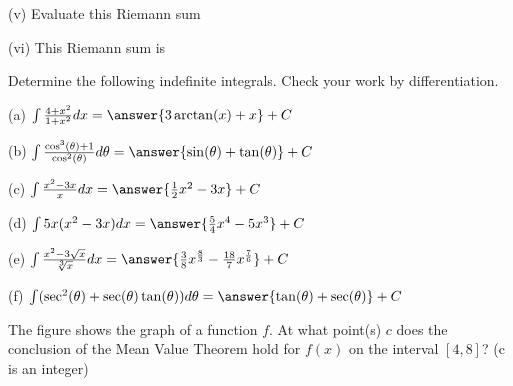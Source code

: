 \documentclass{ximera}
\begin{document}
\begin{exercise}
(v) Evaluate this Riemann sum
\begin{multipleChoice}
\end{multipleChoice}

(vi) This Riemann sum is
\begin{multipleChoice}
\end{multipleChoice}
\end{exercise}

\begin{exercise}
Determine the following indefinite integrals.  Check your work by differentiation.

(a) $\int\frac{4+x^2}{1+x^2}dx=\answer{3\arctan(x)+x }+C$

(b) $\int\frac{\cos^3(\theta)+1}{\cos^2(\theta)}d\theta=\answer{\sin(\theta )+\tan(\theta)}+C$

(c) $\int\frac{x^2-3x}{x}dx=\answer{\frac{1}{2}x^2-3x}+C$

(d) $\int 5x(x^2-3x)dx=\answer{\frac{5}{4}x^4-5x^3}+C$

(e) $\int\frac{x^2-3\sqrt{x}}{\sqrt[3]{x}}dx = \answer{\frac{3}{8}x^{\frac{8}{3}}-\frac{18}{7}x^\frac{7}{6}}+C$

(f) $\int(\sec^2(\theta)+\sec(\theta)\tan(\theta))d\theta=\answer{\tan(\theta)+\sec(\theta)}+C$
\end{exercise}

\begin{exercise}
The figure shows the graph of a function $f$. At what point(s) $c$ does the conclusion of the Mean Value Theorem hold for $f(x)$ on the interval $[4,8]$? (c is an integer)

\begin{image}
\end{image}


\begin{selectAll}
\end{selectAll}
\end{exercise}
\end{document}
